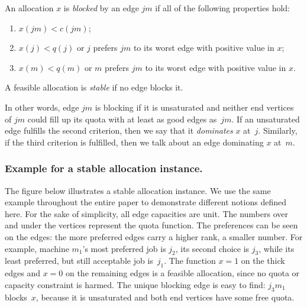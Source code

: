 \documentclass{llncs}
\begin{document}
\begin{definition}
\label{def_st_all}
	An allocation $x$ is \emph{blocked} by an edge $jm$ if all of the following properties hold:
	\begin{enumerate}
		\item $x(jm) < c(jm)$;
		\item\label{j_dom}  $x(j) < q(j)$ or $j$ prefers $jm$ to its worst edge with positive value in $x$;
		\item $x(m) < q(m)$ or $m$ prefers $jm$ to its worst edge with positive value in $x$.
	\end{enumerate}
	A feasible allocation is \emph{stable} if no edge blocks it.
\end{definition}

In other words, edge $jm$ is blocking if it is unsaturated and neither end vertices of $jm$ could fill up its quota with at least as good edges as~$jm$. If an unsaturated edge fulfills the second criterion, then we say that it \emph{dominates} $x$ at~$j$. Similarly, if the third criterion is fulfilled, then we talk about an edge dominating $x$ at~$m$.

\subsubsection{Example for a stable allocation instance.}
The figure below illustrates a stable allocation instance. We use the same example throughout the entire paper to demonstrate different notions defined here. For the sake of simplicity, all edge capacities are unit. The numbers over and under the vertices represent the quota function. The preferences can be seen on the edges: the more preferred edges carry a higher rank, a smaller number. For example, machine $m_1$'s most preferred job is $j_2$, its second choice is $j_3$, while its least preferred, but still acceptable job is~$j_1$. The function $x = 1$ on the thick edges and $x = 0$ on the remaining edges is a feasible allocation, since no quota or capacity constraint is harmed. The unique blocking edge is easy to find: $j_3m_1$ blocks~$x$, because it is unsaturated and both end vertices have some free quota.
\end{document}
